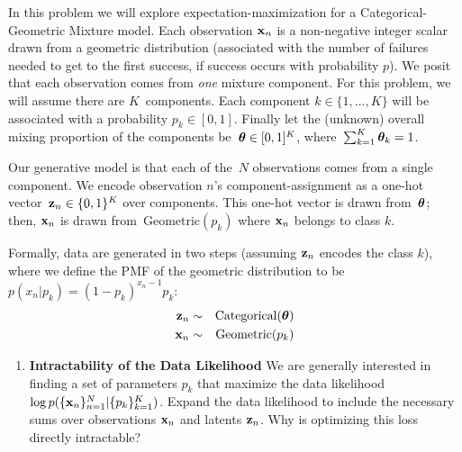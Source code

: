 \documentclass[submit]{harvardml}
\begin{document}
\begin{problem}

In this problem we will explore expectation-maximization for a
Categorical-Geometric Mixture model.  Each observation $\mathbf{x}_n$ is a
non-negative integer scalar drawn from a geometric distribution
(associated with the number of failures needed to get to the first
success, if success occurs with probability $p$).  We posit that each
observation comes from \emph{one} mixture component.  For this
problem, we will assume there are $K$~components. Each component $k
\in \{1, \ldots, K\}$ will be associated with a probability $p_k \in
    [0,1]$.  Finally let the (unknown) overall mixing proportion of
    the components be~$\boldsymbol{\theta} \in [0,1]^K$, where~${\sum_{k=1}^K
      \boldsymbol{\theta}_k=1}$.

Our generative model is that each of the~$N$ observations comes from a
single component.  We encode observation $n$'s component-assignment as
a one-hot vector~${\mathbf{z}_n \in \{0,1\}^K}$ over components. This
one-hot vector is drawn from~$\boldsymbol{\theta}$; then, $\mathbf{x}_n$ is drawn
from~$\text{Geometric}(p_k )$ where $\mathbf{x}_n$ belongs to class $k$.

Formally, data are generated in two steps (assuming $\mathbf{z}_n$ encodes
the class $k$), where we define the PMF of the geometric distribution to be $p(x_n | p_k) = (1 - p_k)^{x_n - 1} p_k$:
\begin{eqnarray*}
 \mathbf{z}_n &\sim& \text{Categorical}(\boldsymbol{\theta}) \\
 \mathbf{x}_n &\sim& \text{Geometric}(p_k )
\end{eqnarray*}

  \begin{enumerate}

  \item \textbf{Intractability of the Data Likelihood} We are
    generally interested in finding a set of parameters $p_k$ that
    maximize the data likelihood $\log
    p(\{\mathbf{x}_n\}^N_{n=1}|\{p_k\}^K_{k = 1})$.  Expand the data
    likelihood to include the necessary sums over observations
    $\mathbf{x}_n$ and latents $\mathbf{z}_n$.  Why is optimizing this loss
    directly intractable?


\end{enumerate}
\end{problem}
\end{document}

